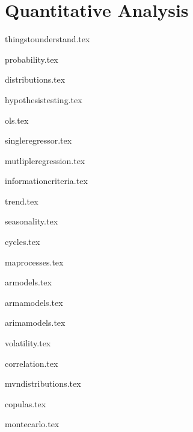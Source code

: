 \documentclass{report}
\begin{document}
	

\tableofcontents		

\part{Quantitative Analysis}
{thingstounderstand.tex}
\pagebreak

{probability.tex}
\pagebreak

{distributions.tex}
\pagebreak

{hypothesistesting.tex}
\pagebreak

{ols.tex}
\pagebreak

{singleregressor.tex}
\pagebreak

{mutlipleregression.tex}
\pagebreak

{informationcriteria.tex}
\pagebreak

{trend.tex}
\pagebreak

{seasonality.tex}

{cycles.tex}
\pagebreak

{maprocesses.tex}
\pagebreak

{armodels.tex}
\pagebreak

{armamodels.tex}
\pagebreak

{arimamodels.tex}

{volatility.tex}
\pagebreak

{correlation.tex}
\pagebreak

{mvndistributions.tex}
\pagebreak

{copulas.tex}
\pagebreak

{montecarlo.tex}
\pagebreak
\end{document}
